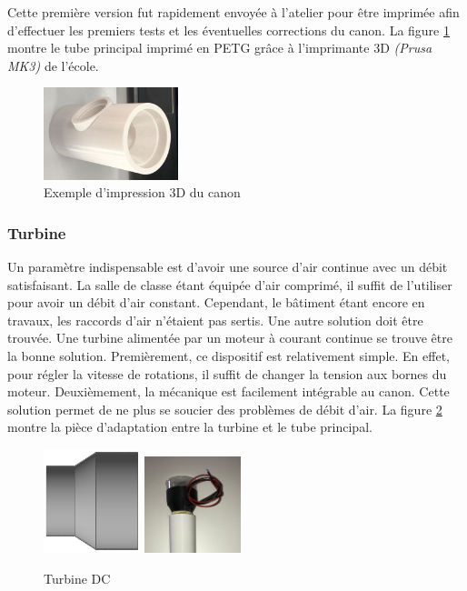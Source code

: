 Cette première version fut rapidement envoyée à l’atelier pour être imprimée afin d’effectuer 
les premiers tests et les éventuelles corrections du canon. La figure \ref{fig:3DPrintCanon} montre 
le tube principal imprimé en PETG grâce à l’imprimante 3D \emph{(Prusa MK3)} de l’école.

\begin{figure}[H]
    \centering
    \includegraphics[width=0.35\textwidth]{Images/photos_PGA/CanonBloc.jpg}
    \caption{Exemple d'impression 3D du canon}
    \label{fig:3DPrintCanon}
\end{figure}

\subsubsection{Turbine}

Un paramètre indispensable est d’avoir une source d’air continue avec un débit satisfaisant. La salle de classe étant 
équipée d’air comprimé, il suffit de l’utiliser pour avoir un débit d’air constant. Cependant, 
le bâtiment étant encore en travaux, les raccords d’air n’étaient pas sertis. Une autre solution doit 
être trouvée. Une turbine alimentée par un moteur à courant continue se trouve être la bonne 
solution. Premièrement, ce dispositif est relativement simple. En effet, pour régler la vitesse de rotations, il suffit 
de changer la tension aux bornes du moteur. Deuxièmement, la mécanique est facilement intégrable 
au canon. Cette solution permet de ne plus se soucier des problèmes de débit d’air. La figure \ref{fig:turbine}
montre la pièce d'adaptation entre la turbine et le tube principal.

\begin{figure}[H]
    \centering
    \includegraphics[width=0.25\textwidth]{Images/photos_PGA/adaptmotventi.PNG}
    \includegraphics[width=0.25\textwidth]{Images/photos_PGA/zoomTurbine.jpg}
    \caption{Turbine DC}
    \label{fig:turbine}
\end{figure}

